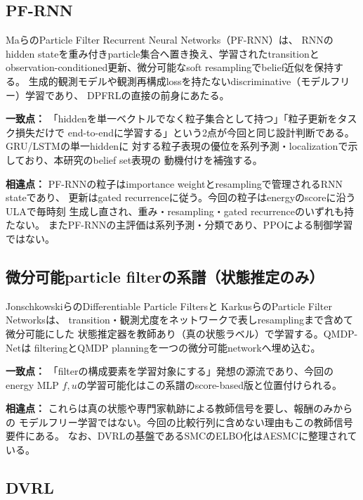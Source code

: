 \documentclass[a4paper,11pt]{article}
\newcommand{\matchpoint}{\par\noindent\textbf{一致点：}}
\newcommand{\difference}{\par\noindent\textbf{相違点：}}
\begin{document}
\subsection{PF-RNN}

MaらのParticle Filter Recurrent Neural Networks（PF-RNN）\cite{ma2020pfrnn}は、
RNNのhidden stateを重み付きparticle集合へ置き換え、学習されたtransitionと
observation-conditioned更新、微分可能なsoft resamplingでbelief近似を保持する。
生成的観測モデルや観測再構成lossを持たないdiscriminative（モデルフリー）学習であり、
DPFRLの直接の前身にあたる。

\matchpoint
「hiddenを単一ベクトルでなく粒子集合として持つ」「粒子更新をタスク損失だけで
end-to-endに学習する」という2点が今回と同じ設計判断である。GRU/LSTMの単一hiddenに
対する粒子表現の優位を系列予測・localizationで示しており、本研究のbelief set表現の
動機付けを補強する。

\difference
PF-RNNの粒子はimportance weightとresamplingで管理されるRNN stateであり、
更新はgated recurrenceに従う。今回の粒子はenergyのscoreに沿うULAで毎時刻
生成し直され、重み・resampling・gated recurrenceのいずれも持たない。
またPF-RNNの主評価は系列予測・分類であり、PPOによる制御学習ではない。

\subsection{微分可能particle filterの系譜（状態推定のみ）}

JonschkowskiらのDifferentiable Particle Filters\cite{jonschkowski2018dpf}と
KarkusらのParticle Filter Networks\cite{karkus2018pfnet}は、
transition・観測尤度をネットワークで表しresamplingまで含めて微分可能にした
状態推定器を教師あり（真の状態ラベル）で学習する。QMDP-Net\cite{karkus2017qmdpnet}は
filteringとQMDP planningを一つの微分可能networkへ埋め込む。

\matchpoint
「filterの構成要素を学習対象にする」発想の源流であり、今回のenergy MLP
$f, u$の学習可能化はこの系譜のscore-based版と位置付けられる。

\difference
これらは真の状態や専門家軌跡による教師信号を要し、報酬のみからの
モデルフリー学習ではない。今回の比較行列に含めない理由もこの教師信号要件にある。
なお、DVRLの基盤であるSMCのELBO化はAESMC\cite{le2018aesmc}に整理されている。

\subsection{DVRL}
\end{document}
